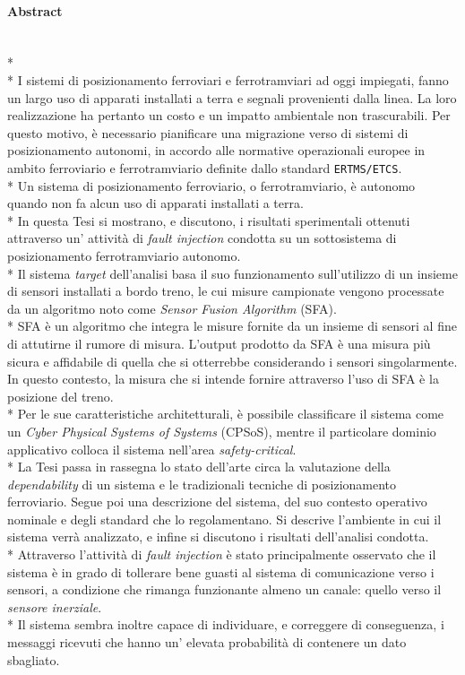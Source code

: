 \paragraph{Abstract}\mbox{}\\*\\*
I sistemi di posizionamento ferroviari e ferrotramviari ad oggi impiegati, fanno un largo uso di apparati installati a terra e segnali provenienti dalla linea. La loro realizzazione ha pertanto un costo e un impatto ambientale non trascurabili. Per questo motivo, \`e necessario pianificare una migrazione verso di sistemi di posizionamento autonomi, in accordo alle normative operazionali europee in ambito ferroviario e ferrotramviario definite dallo standard \texttt{ERTMS/ETCS}.\\*
Un sistema di posizionamento ferroviario, o ferrotramviario, \`e autonomo quando non fa alcun uso di apparati installati a terra.\\*
In questa Tesi si mostrano, e discutono, i risultati sperimentali ottenuti attraverso un' attivit\`a di \emph{fault injection} condotta su un sottosistema di posizionamento ferrotramviario autonomo.\\*
Il sistema \emph{target} dell'analisi basa il suo funzionamento sull'utilizzo di un insieme di sensori installati a bordo treno, le cui misure campionate vengono processate da un algoritmo noto come \emph{Sensor Fusion Algorithm} (SFA).\\*
SFA \`e un algoritmo che integra le misure fornite da un insieme di sensori al fine di attutirne il rumore di misura. L'output prodotto da SFA \`e una misura pi\`u sicura e affidabile di quella che si otterrebbe considerando i sensori singolarmente. In questo contesto, la misura che si intende fornire attraverso l'uso di SFA \`e la posizione del treno.\\*
Per le sue caratteristiche architetturali, \`e possibile classificare il sistema come un \emph{Cyber Physical Systems of Systems} (CPSoS), mentre il particolare dominio applicativo colloca il sistema nell'area \emph{safety-critical}.\\*
La Tesi passa in rassegna lo stato dell'arte circa la valutazione della \emph{dependability} di un sistema e le tradizionali tecniche di posizionamento ferroviario. Segue poi una descrizione del sistema, del suo contesto operativo nominale e degli standard che lo regolamentano. Si descrive l'ambiente in cui il sistema verr\`a analizzato, e infine si discutono i risultati dell'analisi condotta.\\*
Attraverso l'attivit\`a di \emph{fault injection} \`e stato principalmente osservato che il sistema \`e in grado di tollerare bene guasti al sistema di comunicazione verso i sensori, a condizione che rimanga funzionante almeno un canale: quello verso il \emph{sensore inerziale}.\\*
Il sistema sembra inoltre capace di individuare, e correggere di conseguenza, i messaggi ricevuti che hanno un' elevata probabilit\`a di contenere un dato sbagliato.
